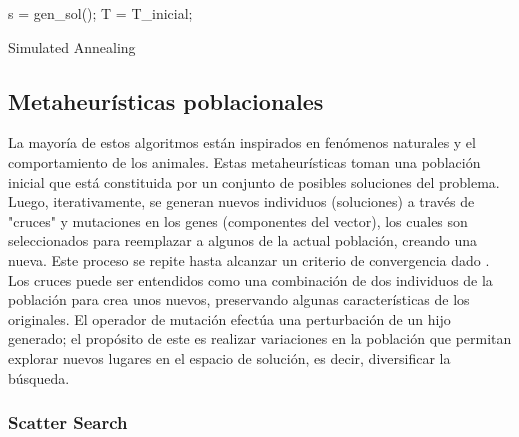 \documentclass{ci5652}
\begin{document}
\begin{algorithm}
 \DontPrintSemicolon
 \vspace*{0.1cm}
  s = gen\_sol();\;
  T = T\_inicial;\;
 \vspace*{0.1cm}
 \caption{Simulated Annealing}
\end{algorithm}


\subsection{Metaheurísticas poblacionales}

La mayoría de estos algoritmos están inspirados en fenómenos naturales y el
comportamiento de los animales. Estas metaheurísticas toman una población
inicial que está constituida por un conjunto de posibles soluciones del 
problema. Luego, iterativamente, se generan nuevos individuos (soluciones) a
través de "cruces" y mutaciones en los genes (componentes del vector), los 
cuales son seleccionados para reemplazar a algunos de la actual población,
creando una nueva. Este proceso se repite hasta alcanzar un criterio de 
convergencia dado \cite{Talbi_2009}.\\ 

Los cruces puede ser entendidos como una combinación de dos individuos de la
población para crea unos nuevos, preservando algunas características de los
originales. El operador de mutación efectúa una perturbación de un hijo 
generado; el propósito de este es realizar variaciones en la población que
permitan explorar nuevos lugares en el espacio de solución, es decir, 
diversificar la búsqueda. 


\subsubsection{Scatter Search}
\end{document}
